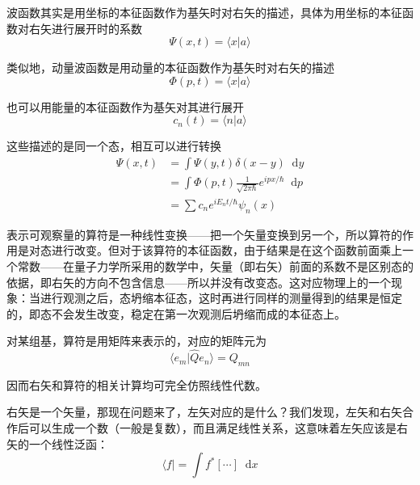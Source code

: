 \documentclass[UTF8]{ctexart}
\begin{document}
    波函数其实是用坐标的本征函数作为基矢时对右矢的描述，具体为用坐标的本征函数对右矢进行展开时的系数
    \begin{equation}
        \Psi(x,t) = \langle x | a \rangle 
    \end{equation}

    类似地，动量波函数是用动量的本征函数作为基矢时对右矢的描述
    \begin{equation}
        \Phi(p,t) = \langle x|a \rangle 
    \end{equation}

    也可以用能量的本征函数作为基矢对其进行展开
    \begin{equation}
        c_n(t) = \langle n|a \rangle 
    \end{equation}

    这些描述的是同一个态，相互可以进行转换
    \begin{equation}
    \begin{aligned} \Psi(x, t) &=\int \Psi(y, t) \delta(x-y) \mathop{}\!\mathrm{d}  y \\ &=\int \Phi(p, t) \frac{1}{\sqrt{2 \pi \hbar}} e^{i p x / \hbar} \mathop{}\!\mathrm{d}  p \\ &=\sum c_{n} e^{i E_n t / \hbar} \psi_{n}(x) \end{aligned}
    \end{equation}

    表示可观察量的算符是一种线性变换——把一个矢量变换到另一个，所以算符的作用是对态进行改变。但对于该算符的本征函数，由于结果是在这个函数前面乘上一个常数——在量子力学所采用的数学中，矢量（即右矢）前面的系数不是区别态的依据，即右矢的方向不包含信息——所以并没有改变态。这对应物理上的一个现象：当进行观测之后，态坍缩本征态，这时再进行同样的测量得到的结果是恒定的，即态不会发生改变，稳定在第一次观测后坍缩而成的本征态上。

    对某组基，算符是用矩阵来表示的，对应的矩阵元为
    \begin{equation}
        \langle e_m|\hat{Q}e_n \rangle  = Q_{mn}
    \end{equation}

\noindent 因而右矢和算符的相关计算均可完全仿照线性代数。

    右矢是一个矢量，那现在问题来了，左矢对应的是什么？我们发现，左矢和右矢合作后可以生成一个数（一般是复数），而且满足线性关系，这意味着左矢应该是右矢的一个线性泛函：
    \begin{equation}
        \langle f | = \int f^* [\cdots] \mathop{}\!\mathrm{d} x
    \end{equation}
\end{document}
